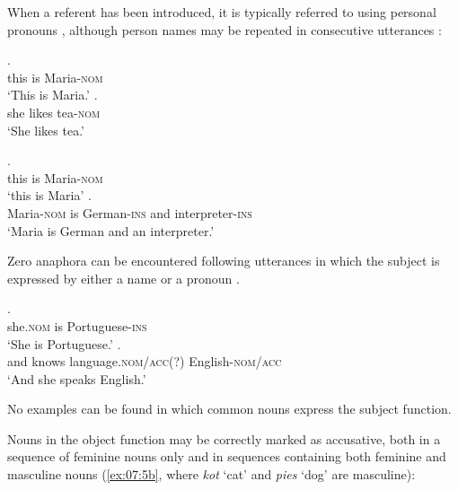 When a referent has been introduced, it is typically referred to using personal pronouns , although person names may be repeated in consecutive utterances :

\ea%
    \label{ex:07:2}
    \ea\label{ex:07:2a}
    .\\
            \hspaceThis{[}this  is  Maria-\textsc{nom}\\
    \glt    ‘This is Maria.’
    \ex\label{ex:07:2b}
    .\\
            \hspaceThis{[}she  likes  tea-\textsc{nom}\\
    \glt    ‘She likes tea.’
    \z
\z

\ea%
    \label{ex:07:3}
    \ea\label{ex:07:3a}
    .\\
            \hspaceThis{[}this  is  Maria-\textsc{nom}\\
    \glt    ‘this is Maria’
    \ex\label{ex:07:3b}
    .\\
            \hspaceThis{[}Maria-\textsc{nom}  is  German-\textsc{ins}  and  interpreter-\textsc{ins}\\
    \glt    ‘Maria is German and an interpreter.’
    \z
\z

Zero anaphora can be encountered  following utterances in which the subject is expressed by either a name or a pronoun .

\ea%
    \label{ex:07:4}
    \ea\label{ex:07:4a}
    .\\
            \hspaceThis{[}she\textsc{.nom}  is  Portuguese-\textsc{ins}\\
    \glt    ‘She is Portuguese.’
    \ex\label{ex:07:4b}
    .\\
            \hspaceThis{[}and  knows  language\textsc{.nom/acc(?)}  English-\textsc{nom}/\textsc{acc} \\
    \glt    ‘And she speaks English.’
    \z
\z

No examples can be found in which common nouns express the subject function. 

Nouns in the object function may be correctly marked as accusative, both in a sequence of feminine nouns only  and in sequences containing both feminine and masculine nouns  (\ref{ex:07:5b}, where \textit{kot} ‘cat’ and \textit{pies} ‘dog’ are masculine):

